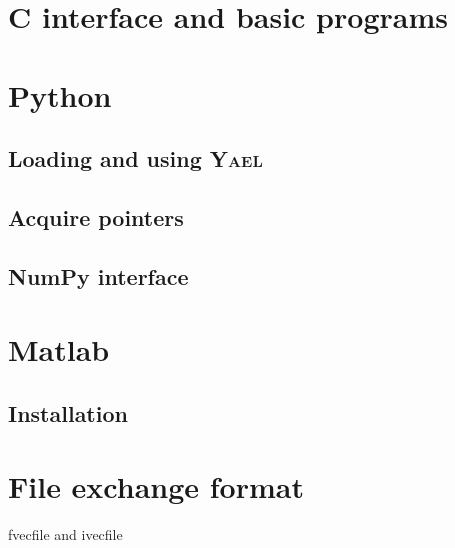 \documentclass[a4paper,11pt,notitlepage,final,twoside]{report}
\newcommand{\yael}{\textsc{Yael}\xspace}
\begin{document}
\chapter{C interface and basic programs}

\chapter{Python}

\section{Loading and using \yael}

\section{Acquire pointers}

\section{NumPy interface}


\chapter{Matlab}

\section{Installation}



\appendix                     %

\chapter{File exchange format}               %

fvecfile and ivecfile




\end{document}
